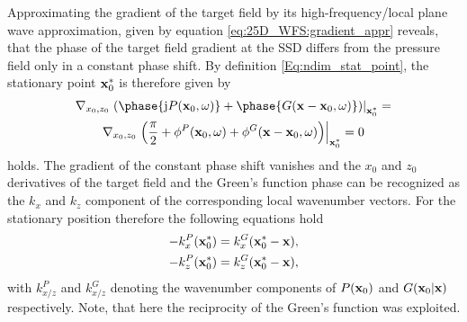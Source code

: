Approximating the gradient of the target field by its high-frequency/local plane wave approximation, given by equation \eqref{eq:25D_WFS:gradient_appr} reveals, that the phase of the target field gradient at the SSD differs from the pressure field only in a constant phase shift.
By definition \eqref{Eq:ndim_stat_point}, the stationary point $\mathbf{x}_0^*$ is therefore given by
\begin{multline}
\nabla_{x_0,z_0} \left.
\left( \phase{ \ti P(\vxo,\omega)} + \phase{ G(\vx-\vxo,\omega)} \right) \right|_{\vxo^*} =
\\
\nabla_{x_0,z_0} \left.
\left( \frac{\pi}{2}+ \phi^P(\vxo,\omega) + \phi^G(\vx-\vxo,\omega) \right) \right|_{\vxo^*} = 0
\end{multline}
holds.
The gradient of the constant phase shift vanishes and the $x_0$ and $z_0$ derivatives of the target field and the Green's function phase can be recognized as the $k_x$ and $k_z$ component of the corresponding local wavenumber vectors.
For the stationary position therefore the following equations hold
\begin{align}
\begin{split}
-k_{x}^P(\mathbf{x}_0^*) &= k_{x}^G(\mathbf{x}_0^* - \mathbf{x}), \\
-k_{z}^P(\mathbf{x}_0^*) &= k_{z}^G(\mathbf{x}_0^* - \mathbf{x}),
\end{split}
\end{align}
with $k_{x/z}^{P}$ and $k_{x/z}^{G}$ denoting the wavenumber components of $P(\mathbf{x}_0)$ and $G(\mathbf{x}_0|\mathbf{x})$ respectively.
Note, that here the reciprocity of the Green's function was exploited.
%
